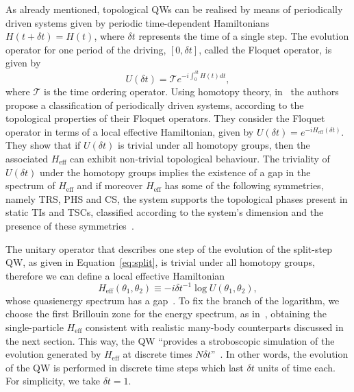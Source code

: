As already mentioned, topological QWs can be realised by means of periodically driven systems given by periodic time-dependent Hamiltonians  $H(t+\delta t)=H(t)$, where $\delta t$ represents the time of a single step. The evolution operator for one period of the driving, $[0,\delta t]$, called the Floquet operator, is given by
\begin{equation}
\label{eq:floquet}
U(\delta t)=\mathcal{T}e^{-i\int_{0}^{\delta t}H(t)dt},
\end{equation}
where $\mathcal{T}$ is the time ordering operator. Using homotopy theory, in~\cite{kit:ber:rud:dem:10} the authors propose a classification of periodically driven systems, according to the topological properties of their Floquet operators. They consider the Floquet operator in terms of a local effective Hamiltonian, given by $U(\delta t)=e^{-iH_\text{eff}(\delta t)}$. They show that if $U(\delta t)$ is trivial under all homotopy groups, then the associated $H_\text{eff}$ can exhibit non-trivial topological behaviour. The triviality of $U(\delta t)$ under the homotopy groups implies the existence of a gap in the spectrum of $H_\text{eff}$ and if moreover $H_\text{eff}$ has some of the following symmetries, namely TRS, PHS and  CS, the system supports the topological phases present in static TIs and TSCs, classified according to the system's dimension and the presence of these symmetries~\cite{sch:ryu:fur:lud:08,kit:09}.

The unitary operator that describes one step of the evolution of the split-step QW, as given in Equation~\eqref{eq:split}, is trivial under all homotopy groups, therefore we can define a local effective Hamiltonian 
\begin{equation}
H_{\text{eff}}(\theta_1,\theta_2) \equiv -i\delta t^{-1}\log U(\theta_1,\theta_2), 
\end{equation}
whose quasienergy spectrum has a gap~\cite{kit:ber:rud:dem:10}.
To fix the branch of the logarithm, we choose the first Brillouin zone for the energy spectrum, as in~\cite{asb:12,asb:obu:13}, obtaining the single-particle $H_{\text{eff}}$ consistent with realistic many-body counterparts discussed in the next section. This way, the QW ``provides a stroboscopic simulation of the evolution generated by $H_{\text{eff}}$ at discrete times $N\delta t$''~\cite{kit:rud:ber:dem:10}. In other words, the evolution of the QW is performed in discrete time steps which last $\delta{t}$ units of time each. For simplicity, we take $\delta t=1$.

